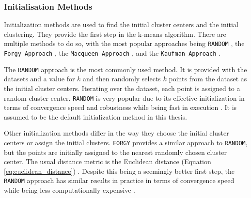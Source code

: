 \subsubsection{Initialisation Methods}
\label{subsec:initialisation_methods}
Initialization methods are used to find the initial cluster centers and the initial clustering.
They provide the first step in the k-means algorithm.
There are multiple methods to do so, with the most popular approaches being \texttt{RANDOM} \cite{PEN-ECI}, the \texttt{Forgy Approach} \cite{AND-CAA}, the \texttt{Macqueen Approach} \cite{MCQ-MCA}, and the \texttt{Kaufman Approach} \cite{KAU-FGD}.

The \texttt{RANDOM} approach is the most commonly used method.
It is provided with the datasets and a value for $k$ and then randomly selects $k$ points from the dataset as the initial cluster centers.
Iterating over the dataset, each point is assigned to a random cluster center.
\texttt{RANDOM} is very popular due to its effective initialization in terms of convergence speed and robustness while being fast in execution \cite{PEN-ECI}.
It is assumed to be the default initialization method in this thesis.

Other initialization methods differ in the way they choose the initial cluster centers or assign the initial clusters.
\texttt{FORGY} provides a similar approach to \texttt{RANDOM}, but the points are initially assigned to the nearest randomly chosen cluster center.
The usual distance metric is the Euclidean distance (Equation \ref{eq:euclidean_distance}) \cite{AND-CAA}.
Despite this being a seemingly better first step, the \texttt{RANDOM} approach has similar results in practice in terms of convergence speed while being less computationally expensive \cite{AND-CAA}.

